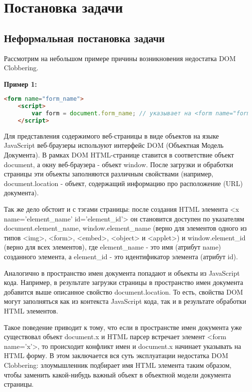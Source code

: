 
\chapter{Постановка задачи}\label{Introduction}

\section{Неформальная постановка задачи}

Рассмотрим на небольшом примере причины возникновения недостатка DOM Clobbering.

\bigskip
\textbf{Пример 1:}

\begin{lstlisting}[language=HTML]
	<form name="form_name">
	<script>
		var form = document.form_name; // указывает на <form name="form_name">
	</script>
\end{lstlisting}
\bigskip




Для представления содержимого веб-страницы в виде объектов на языке JavaScript веб-браузеры используют интерфейс DOM (Объектная Модель Документа). В рамках DOM HTML-странице ставится в соответствие объект document, а окну веб-браузера - объект window. После загрузки и обработки страницы эти объекты заполняются различным свойствами (например, document.location - объект, содержащий информацию про расположение (URL) документа).


Так же дело обстоит и с тэгами страницы: после создания HTML элемента <x name='element\_name' id='element\_id'> он становится доступен по указателям document.element\_name, window.element\_name (верно для элементов одного из типов <img>, <form>, <embed>, <object> и <applet>) и window.element\_id (верно для всех элементов), где element\_name - это имя (атрибут name) созданного элемента, а element\_id - это идентификатор элемента (атрибут id).



Аналогично в пространство имен документа попадают и объекты из JavaScript кода. Например, в результате загрузки страницы в пространство имен документа добавится выше описанное свойство document.location. То есть, свойства DOM могут заполняться как из контекста JavaScript кода, так и в результате обработки HTML элементов.


Такое поведение приводит к тому, что если в пространстве имен документа уже существовал объект document.x и HTML парсер встречает элемент <form name='x'>, то происходит конфликт имен и document.x начинает указывать на HTML форму. В этом заключается вся суть эксплуатации недостатка DOM Clobbering: злоумышленник подбирает имя HTML элемента таким образом, чтобы заменить какой-нибудь важный объект в объектной модели документа страницы.


